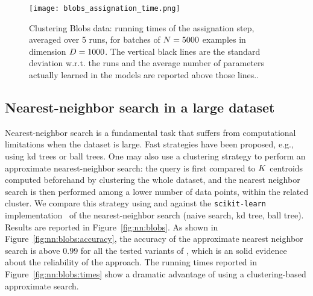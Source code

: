 
\begin{figure}[tbh]
\centering
\texttt{[image: blobs\_assignation\_time.png]}
\caption{Clustering Blobs data: running times of the assignation step, averaged over 5 runs, for batches of $N=5000$ examples in dimension $D=1000$. The vertical black lines are the standard deviation w.r.t. the runs and the average number of parameters actually learned  in the models are reported above those lines..}
\label{fig:clustering:blobs:assignation_time}
\end{figure}

\subsection{Nearest-neighbor search in a large dataset}
Nearest-neighbor search is a fundamental task that suffers from computational limitations when the dataset is large.
Fast strategies have been proposed, e.g., using kd trees or ball trees.
One may also use a clustering strategy to perform an approximate nearest-neighbor search: the query is first compared to $K$ centroids computed beforehand by clustering the whole dataset, and the nearest neighbor search is then performed among a lower number of data points, within the related cluster.
We compare this strategy using \kmeans and \qkmeans against the \texttt{scikit-learn} implementation~\cite{Pedregosa2011Scikit} of the nearest-neighbor search (naive search, kd tree, ball tree).
Results are reported in Figure~\ref{fig:nn:blobs}.
As shown in Figure~\ref{fig:nn:blobs:accuracy}, the accuracy of the approximate nearest neighbor search is above $0.99$  for all the tested variants of \qkmeans, which is an solid evidence about the reliability of the approach. 
The running times reported in Figure~\ref{fig:nn:blobs:times} show a dramatic advantage of using a clustering-based approximate search.

